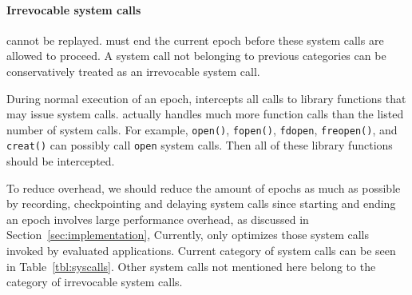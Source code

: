 \paragraph{Irrevocable system calls} cannot be replayed. \doubletake{} must end the current epoch 
before these system calls are allowed to proceed. A system call not belonging to previous categories
can be conservatively treated as an irrevocable system call.

\vspace*{\baselineskip} 
During normal execution of an epoch, \doubletake{} intercepts all calls to \pthreads{} 
library functions that may issue system calls. \doubletake{} actually handles much more function calls
than the listed number of system calls. For example, \texttt{open()}, \texttt{fopen()}, \texttt{fdopen}, \texttt{freopen()}, and \texttt{creat()} can possibly call \texttt{open} system calls. 
Then all of these library functions should be intercepted. 

To reduce overhead, we should reduce the amount of epochs as much as possible by 
recording, checkpointing and delaying system calls since starting and ending an epoch 
involves large performance overhead, as discussed in Section~\ref{sec:implementation}, 
Currently, \doubletake{} only optimizes those system calls invoked by evaluated applications.
Current category of system calls can be seen in Table~\ref{tbl:syscalls}. Other system calls
not mentioned here belong to the category of irrevocable system calls. 

\begin{comment}
To support multithreading programs, \DoubleTake{} has to record the order of synchronizations 
and replay them in the same order (Section~\ref{sec:multithreading}) and design memory allocator specially (Section~\ref{sec:mtheap}).

The basic idea of \DoubleTake{} is to greatly {\em reduce the number of checkings}:  
instead of checking a possible out-of-bounds error before every memory access, 
\DoubleTake{} checks all possible out-of-bounds errors of the whole program 
before those irrevocable system calls or in the end of an execution.
By checking buffer overflows accumulatively, \DoubleTake{} amortizes 
checking overhead over long executions and achieves much better performance. 
As showed in Figure~\ref{fig:diagram}, if a program does not have buffer overflows, 
it continues to perform those system calls and 
starts a new epoch after them by snapshotting state of this execution. 
If a program is found to have buffer overflows, \DoubleTake{} re-executes it by rolling back 
to last good state after installing hardware watchpoints on those overflowing addresses.
By handling exceptions, 
\DoubleTake{} can pinpoint precisely those memory accesses causing memory overflows without
actually instrumenting every access. 
\end{comment}


